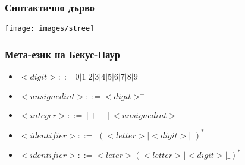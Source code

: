 \documentclass{beamer}
\begin{document}
\begin{frame}[fragile]
\frametitle{Синтактично дърво}

\begin{center}
\vspace*{-40pt}
\texttt{[image: images/stree]}
\end{center}



\end{frame}

\begin{frame}[fragile]
\frametitle{Мета-език на Бекус-Наур}

\begin{itemize}
\item $<digit> ::= 0 | 1 | 2 | 3 | 4 | 5 | 6 | 7 | 8 | 9 $
\item $<unsigned int> ::= <digit>^+$
\item $<integer> ::= [+|-] <unsigned int>$
\item $<identifier> ::= \_ (<letter> | <digit> | \_ )^* $
\item $<identifier> ::= <leter> (<letter> | <digit> | \_ )^* $
\end{itemize}

\end{frame}
\end{document}
